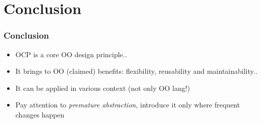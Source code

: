 \documentclass{beamer}
\begin{document}
\section{Conclusion}
\begin{frame}
  \frametitle{Conclusion}
  \begin{itemize}
	\item<+-> OCP is a core OO design principle..
	\item<+-> It brings to OO (claimed) benefits: flexibility, reusability and maintainability..
	\item<+-> It can be applied in various context (not only OO lang!)
	\item<+-> Pay attention to \textit{premature abstraction}, introduce it only where frequent changes happen
   \end{itemize}
\end{frame}
\end{document}
